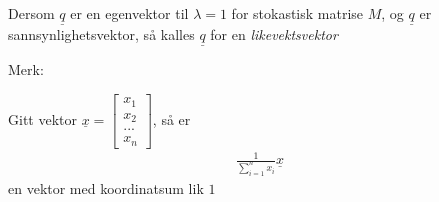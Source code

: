\documentclass[11pt, a4paper, norsk]{article}
\begin{document}
            \begin{Definition}{}{}
                Dersom $\underline{q}$ er en egenvektor til $\lambda = 1$ for stokastisk matrise $M$, og $\underline{q}$ er sannsynlighetsvektor, så kalles $\underline{q}$ for en \textit{likevektsvektor}

                Merk:

                Gitt vektor $\underline{x} = \begin{bmatrix}
                    x_1 \\
                    x_2 \\
                    ... \\
                    x_{n}
                \end{bmatrix}$, så er \begin{align*}
                    \frac{1}{\sum_{i=1}^{n}x_{i}} \underline{x}
                \end{align*}
                en vektor med koordinatsum lik $1$
            \end{Definition} 
\end{document}
